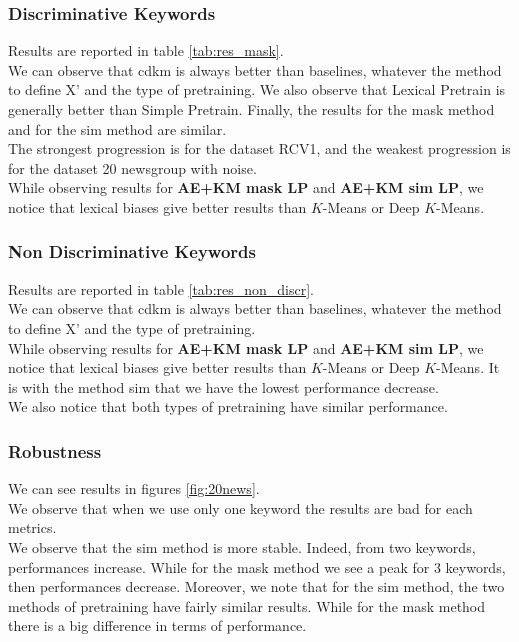\subsubsection{Discriminative Keywords}
Results are reported in table \ref{tab:res_mask}.
\\We can observe that cdkm is always better than baselines, whatever the method 
to define X' and the type of pretraining. We also observe that Lexical Pretrain 
is generally better than Simple Pretrain. Finally, the results for the mask method
and for the sim method are similar.
\\The strongest progression is for the dataset RCV1, and the weakest progression 
is for the dataset 20 newsgroup with noise.
\\While observing results for \textbf{AE+KM mask LP} and \textbf{AE+KM sim LP},
we notice that lexical biases give better results than $K$-Means  or Deep 
$K$-Means.
\subsubsection{Non Discriminative Keywords}
Results are reported in table \ref{tab:res_non_discr}.
\\We can observe that cdkm is always better than baselines, whatever the method 
to define X' and the type of pretraining.
\\While observing results for \textbf{AE+KM mask LP} and \textbf{AE+KM sim LP},
we notice that lexical biases give better results than $K$-Means  or Deep 
$K$-Means. It is with the method sim that we have the lowest performance 
decrease.
\\We also notice that both types of pretraining have similar performance.
\subsubsection{Robustness}
We can see results  in figures \ref{fig:20news}.
\\We observe that when we use only one keyword the results are bad for each metrics.
\\We observe that the sim method is more stable. Indeed, from two keywords, 
performances increase. While for the mask method we see a peak for 3 keywords, 
then performances decrease. Moreover, we note that for the sim method, the two 
methods of pretraining have fairly similar results. While for the mask method 
there is a big difference in terms of performance.